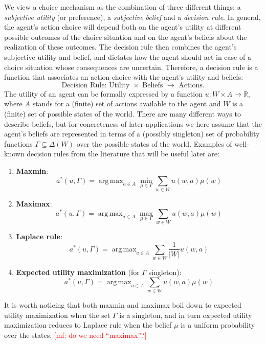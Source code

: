 \documentclass[fleqn,reqno,12pt]{article}
\theoremstyle{Satz}
\theoremstyle{Bsp}
\DeclareMathOperator*{\argmax}{arg\,max}
\newcommand{\mf}[1]{\textcolor{Red}{[mf: #1]}}
\begin{document}
We view a choice mechanism as the combination of three different things: a \textit{subjective utility} (or preference), a \textit{subjective belief} and a \textit{decision rule}. In general, the agent's action choice will depend both on the agent's utility at different possible outcomes of the choice situation and on the agent's beliefs about the realization of these outcomes. The decision rule then combines the agent's subjective utility and belief, and dictates how the agent should act in case of a choice situation whose consequences are uncertain. Therefore, a decision rule is a function that associates an action choice with the agent's utility and beliefs:
$$ \text{Decision Rule: Utility }\times\text{ Beliefs } \rightarrow \text{ Actions.}  $$
The utility of an agent can be formally expressed by a function
$u:W \times A \rightarrow \mathbb{R} $, where $A$ stands for a (finite) set of actions
available to the agent and $W$ is a (finite) set of possible states of the world. There are
many different ways to describe beliefs, but for concreteness of later applications we here
assume that the agent's beliefs are represented in terms of a (possibly singleton) set of
probability functions $\Gamma \subseteq \Delta(W) $ over the possible states of the
world. Examples of well-known decision rules from the literature that will be useful later are:
\begin{enumerate}

\item \textbf{Maxmin}: $$ a^*(u,\Gamma)= \argmax_{a \in A} \min_{\mu \in \Gamma} \sum_{w\in W} u(w,a)  \mu(w)$$

\item \textbf{Maximax}: $$ a^*(u,\Gamma)= \argmax_{a \in A} \max_{\mu \in \Gamma} \sum_{w\in W} u(w,a)  \mu(w)$$

\item \textbf{Laplace rule}: $$ a^*(u,\Gamma)= \argmax_{a \in A} \sum_{w\in W} \frac{1}{|W|}  u(w,a) $$

\item \textbf{Expected utility maximization} (for $\Gamma$ singleton): $$ a^*(u,\Gamma)= \argmax_{a \in A} \sum_{w\in W} u(w,a)  \mu(w)$$

\end{enumerate}

It is worth noticing that both maxmin and maximax boil down to expected utility maximization
when the set $\Gamma$ is a singleton, and in turn expected utility maximization reduces to
Laplace rule when the belief $\mu$ is a uniform probability over the states.  \mf{do we need
  ``maximax''?}
 
\end{document}
